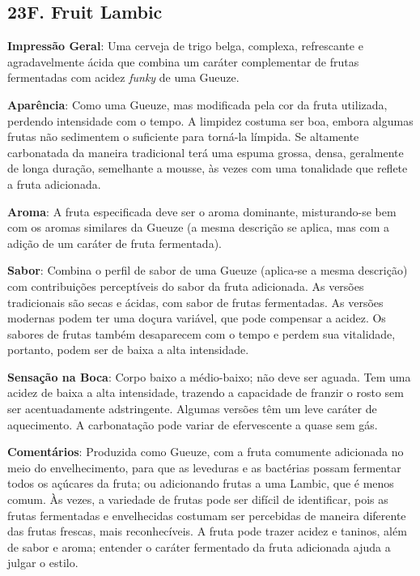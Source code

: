 \subsection*{23F. Fruit Lambic}
\textbf{Impressão Geral}: Uma cerveja de trigo belga, complexa, refrescante e agradavelmente ácida que combina um caráter complementar de frutas fermentadas com acidez \textit{funky} de uma Gueuze.

\textbf{Aparência}: Como uma Gueuze, mas modificada pela cor da fruta utilizada, perdendo intensidade com o tempo. A limpidez costuma ser boa, embora algumas frutas não sedimentem o suficiente para torná-la límpida. Se altamente carbonatada da maneira tradicional terá uma espuma grossa, densa, geralmente de longa duração, semelhante a mousse, às vezes com uma tonalidade que reflete a fruta adicionada.

\textbf{Aroma}: A fruta especificada deve ser o aroma dominante, misturando-se bem com os aromas similares da Gueuze (a mesma descrição se aplica, mas com a adição de um caráter de fruta fermentada).

\textbf{Sabor}: Combina o perfil de sabor de uma Gueuze (aplica-se a mesma descrição) com contribuições perceptíveis do sabor da fruta adicionada. As versões tradicionais são secas e ácidas, com sabor de frutas fermentadas. As versões modernas podem ter uma doçura variável, que pode compensar a acidez. Os sabores de frutas também desaparecem com o tempo e perdem sua vitalidade, portanto, podem ser de baixa a alta intensidade.

\textbf{Sensação na Boca}: Corpo baixo a médio-baixo; não deve ser aguada. Tem uma acidez de baixa a alta intensidade, trazendo a capacidade de franzir o rosto sem ser acentuadamente adstringente. Algumas versões têm um leve caráter de aquecimento. A carbonatação pode variar de efervescente a quase sem gás.

\textbf{Comentários}: Produzida como Gueuze, com a fruta comumente adicionada no meio do envelhecimento, para que as leveduras e as bactérias possam fermentar todos os açúcares da fruta; ou adicionando frutas a uma Lambic, que é menos comum. Às vezes, a variedade de frutas pode ser difícil de identificar, pois as frutas fermentadas e envelhecidas costumam ser percebidas de maneira diferente das frutas frescas, mais reconhecíveis. A fruta pode trazer acidez e taninos, além de sabor e aroma; entender o caráter fermentado da fruta adicionada ajuda a julgar o estilo.

